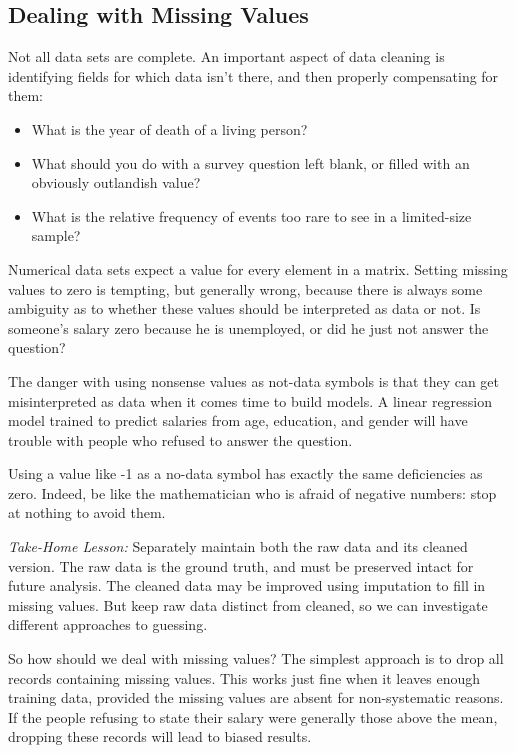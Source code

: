 \documentclass[10pt]{article}
\begin{document}
\subsection{Dealing with Missing Values}
Not all data sets are complete. An important aspect of data cleaning is identifying fields for which data isn't there, and then properly compensating for them:

\begin{itemize}
  \item What is the year of death of a living person?
  \item What should you do with a survey question left blank, or filled with an obviously outlandish value?
  \item What is the relative frequency of events too rare to see in a limited-size sample?
\end{itemize}

Numerical data sets expect a value for every element in a matrix. Setting missing values to zero is tempting, but generally wrong, because there is always some ambiguity as to whether these values should be interpreted as data or not. Is someone's salary zero because he is unemployed, or did he just not answer the question?

The danger with using nonsense values as not-data symbols is that they can get misinterpreted as data when it comes time to build models. A linear regression model trained to predict salaries from age, education, and gender will have trouble with people who refused to answer the question.

Using a value like -1 as a no-data symbol has exactly the same deficiencies as zero. Indeed, be like the mathematician who is afraid of negative numbers: stop at nothing to avoid them.

\emph{Take-Home Lesson:} Separately maintain both the raw data and its cleaned version. The raw data is the ground truth, and must be preserved intact for future analysis. The cleaned data may be improved using imputation to fill in missing values. But keep raw data distinct from cleaned, so we can investigate different approaches to guessing.

So how should we deal with missing values? The simplest approach is to drop all records containing missing values. This works just fine when it leaves enough training data, provided the missing values are absent for non-systematic reasons. If the people refusing to state their salary were generally those above the mean, dropping these records will lead to biased results.
\end{document}
